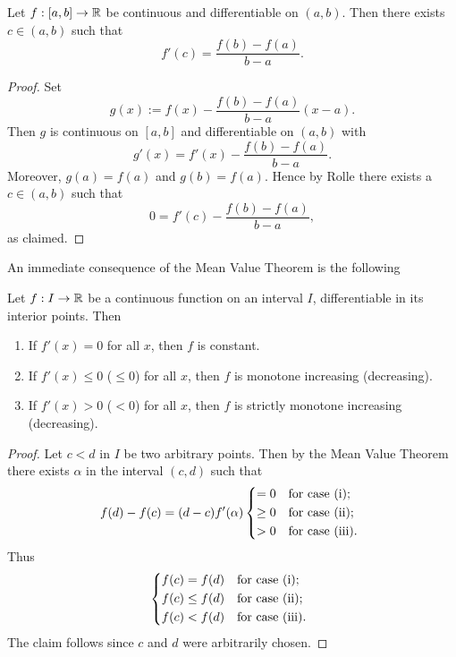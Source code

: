 \documentclass[10pt, a4paper]{article}
\begin{document}
\begin{theorem}\label{pre:analy:thm:meanvaluethm}
    Let $f : [a, b] \rightarrow \mathbb{R}$ be continuous and differentiable on $(a, b)$.
    Then there exists $c \in (a, b)$ such that
    \[
    f'(c) = \frac{f(b) - f(a)}{b - a}.
    \]
    \begin{proof}
        Set
        \[
        g(x) := f(x) - \frac{f(b) - f(a)}{b - a}(x - a).
        \]
        Then $g$ is continuous on $[a, b]$ and differentiable on $(a, b)$ with
        \[
        g'(x) = f'(x) - \frac{f(b) - f(a)}{b - a}.
        \]
        Moreover,
        $g(a) = f(a)$ and $g(b) = f(a)$.
        Hence by Rolle there exists a $c \in (a, b)$ such that
        \[
        0 = f'(c) - \frac{f(b) - f(a)}{b - a},
        \]
        as claimed.
    \end{proof}
\end{theorem}

An immediate consequence of the Mean Value Theorem is the following
\begin{theorem}
    Let $f : I \rightarrow \mathbb{R}$ be a continuous function on an interval $I$,
    differentiable in its interior points.
    Then
    \begin{enumerate}[label = (\roman*)]
        \item If $f'(x) = 0$ for all $x$,
        then $f$ is constant.
        \item If $f'(x) \leq 0$ ($\leq 0$) for all $x$,
        then $f$ is monotone increasing
        (decreasing).
        \item If $f'(x) > 0$ ($< 0$) for all $x$,
        then $f$ is strictly monotone increasing
        (decreasing).
    \end{enumerate}
    \begin{proof}
        Let $c < d$ in $I$ be two arbitrary points.
        Then by the Mean Value Theorem there exists $\alpha$ in the interval $(c, d)$ such that
        \[
        f(d) - f(c) = (d - c)f'(\alpha) \begin{dcases*}
            = 0 & for case (i); \\
            \geq 0 & for case (ii); \\
            > 0 & for case (iii).
        \end{dcases*}
        \]
        Thus
        \[
        \begin{dcases*}
            f(c) = f(d) & for case (i); \\
            f(c) \leq f(d) & for case (ii); \\
            f(c) < f(d) & for case (iii).
        \end{dcases*}
        \]
        The claim follows since $c$ and $d$ were arbitrarily chosen.
    \end{proof}
\end{theorem}
\end{document}
